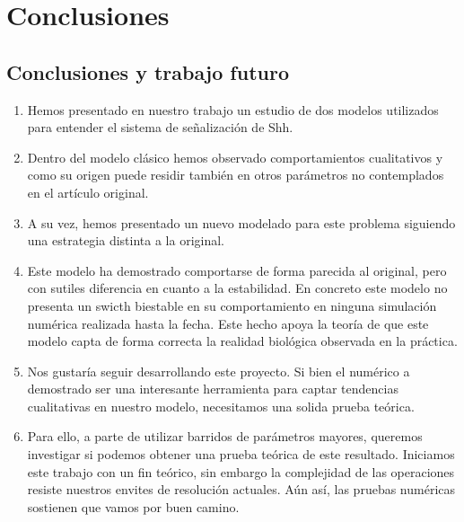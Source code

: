 
\chapter{Conclusiones}

\label{ch:conclusions}

\section{Conclusiones y trabajo futuro}
\begin{enumerate}
	\item Hemos presentado en nuestro trabajo un estudio de dos modelos utilizados para entender el sistema de señalización de Shh. 
	\item  Dentro del modelo clásico hemos observado comportamientos cualitativos y como su origen puede residir también en otros parámetros no contemplados en el artículo original.
	\item  A su vez, hemos presentado un nuevo modelado para este problema siguiendo una estrategia distinta a la original.
	\item Este modelo ha demostrado comportarse de forma parecida al original, pero con sutiles diferencia en cuanto a la estabilidad. En concreto este modelo no presenta un swicth biestable en su comportamiento en ninguna simulación numérica realizada hasta la fecha. Este hecho apoya la teoría de que este modelo capta de forma correcta la realidad biológica observada en la práctica.
	\item Nos gustaría seguir desarrollando este proyecto. Si bien el numérico a demostrado ser una interesante herramienta para captar tendencias cualitativas en nuestro modelo, necesitamos una solida prueba teórica.
	\item Para ello, a parte de utilizar barridos de parámetros mayores, queremos investigar si podemos obtener una prueba teórica de este resultado. Iniciamos este trabajo con un fin teórico, sin embargo la complejidad de las operaciones resiste nuestros envites de resolución actuales. Aún así, las pruebas numéricas sostienen que vamos por buen camino.
\end{enumerate}



 

 
 
 